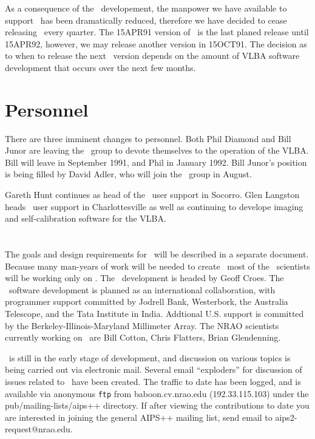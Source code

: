 As a consequence of the \AIPTOO\ developement,
the manpower we have available to
support \AIPS\ has been dramatically reduced, therefore we have decided
to cease releasing \AIPS\ every quarter.
The 15APR91 version of \AIPS\
is the last planed release until 15APR92,
however, we may release another version in 15OCT91.
The decision as to when to release the next \AIPS\ version
depends on the amount of VLBA software development
that occurs over the next few months.

\section{Personnel}
There are three imminent changes to personnel.  Both Phil Diamond and Bill
Junor are leaving the \AIPS\ group to devote themselves to
the operation of the VLBA.
Bill will leave in September 1991, and Phil in January 1992.
Bill Junor's position is being filled by David
Adler, who will join the \AIPS\ group in August.

Gareth Hunt continues as head of the \AIPS\  user support in Socorro.  Glen
Langston heads \AIPS\  user support in Charlottesville as well as
continuing to develope imaging and self-calibration software for the VLBA.

\section{\AIPTOO}
The goals and design requirements for \AIPTOO\ will be described in a separate
document.  Because many man-years of work will be needed to create \AIPTOO\,
most of the \AIPS\  scientists will be working only on \AIPTOO.  The \AIPTOO\
development is headed by Geoff Croes.  The \AIPTOO\  software development is
planned as an international collaboration, with programmer support committed by
Jodrell Bank, Westerbork, the Australia Telescope, and the Tata Institute in
India.  Addtional U.S. support is committed by the Berkeley-Illinois-Maryland
Millimeter Array.  The NRAO scientists currently working on \AIPTOO\  are Bill
Cotton, Chris Flatters, Brian Glendenning.

\AIPTOO\  is still in the early stage of development, and
discussion on various topics is being carried out via electronic mail.
Several email ``exploders'' for discussion of issues related to \AIPTOO\  have
been created. The traffic to date has been logged, and is available via
anonymous {\tt ftp} from baboon.cv.nrao.edu (192.33.115.103) under the
pub/mailing-lists/aips++ directory. If after viewing the contributions to date
you are interested in joining the general AIPS++ mailing list, send email to
aips2-request@nrao.edu.

